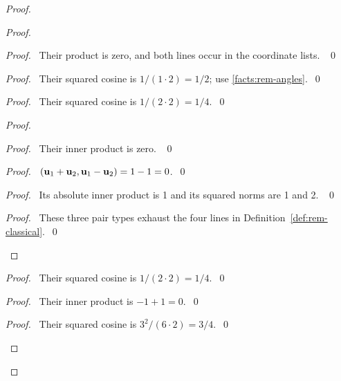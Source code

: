 \begin{proof}
\begin{proof}
\begin{proof}\pf\ Their product is zero, and both lines occur in the
coordinate lists. ~\qed\end{proof}
\begin{proof}\pf\ Their squared cosine is $1/(1\cdot2)=1/2$;
use \ref{facts:rem-angles}.~\qed\end{proof}
\begin{proof}\pf\ Their squared cosine is $1/(2\cdot2)=1/4$.~\qed\end{proof}
\begin{proof}
\begin{proof}\pf\ Their inner product is zero. ~\qed\end{proof}
\begin{proof}\pf\ $({\mathbf u}_1+{\mathbf u}_2,{\mathbf u}_1-{\mathbf u}_2)=1-1=0$.~\qed\end{proof}
\begin{proof}\pf\ Its absolute inner product is 1 and its squared norms
are 1 and 2. ~\qed\end{proof}
\qedstep
\begin{proof}\pf\ These three pair types exhaust the four lines
in Definition~\ref{def:rem-classical}.~\qed\end{proof}
\end{proof}
\begin{proof}\pf\ Their squared cosine is $1/(2\cdot2)=1/4$.~\qed\end{proof}
\begin{proof}\pf\ Their inner product is $-1+1=0$.~\qed\end{proof}
\begin{proof}\pf\ Their squared cosine is $3^2/(6\cdot2)=3/4$.~\qed\end{proof}

\end{proof}
\end{proof}
